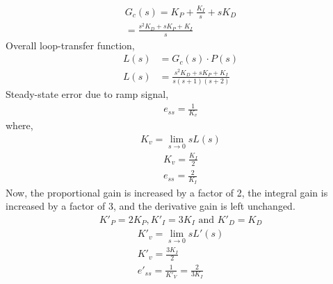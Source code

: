 \documentclass[journal,12pt,twocolumn]{IEEEtran}
\theoremstyle{remark}
\begin{document}
\begin{align}
    G_c(s) = K_P + \frac{K_I}{s} +sK_D\\
    =\frac{s^2K_D + sK_P + K_I}{s}
\end{align}
Overall loop-transfer function,
\begin{align}
    L(s) &= G_c(s)\cdot P(s)\\
    L(s) &= \frac{s^2K_D + sK_P + K_I}{s(s+1)(s+2)}
\end{align}
Steady-state error due to ramp signal,
\begin{align}
    e_{ss} = \frac{1}{K_v}
\end{align}
where,
\begin{align}
    K_v = \lim_{s \to 0} sL(s)
\end{align}
\begin{align}
    K_v = \frac{K_I}{2}\\
    e_{ss} = \frac{2}{K_I}
\end{align}
Now, the proportional gain is increased by a factor of 2, the integral gain is increased by a factor of 3, and the derivative gain is left unchanged.
\begin{align}
    K'_P = 2K_P, K'_I = 3K_I \text{ and } K'_D = K_D
\end{align}
\begin{align}
    K'_v = \lim_{s \to 0} sL'(s)\\
    K'_v = \frac{3K_I}{2}\\
    e'_{ss} = \frac{1}{K'_V} = \frac{2}{3K_I}
\end{align}



% 
\end{document}
